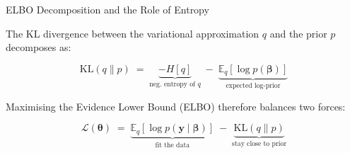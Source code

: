 \documentclass[aspectratio=169,12pt]{beamer}
\newcommand{\KL}{\mathrm{KL}}
\begin{document}
\begin{frame}{ELBO Decomposition and the Role of Entropy}

\bigskip

The KL divergence between the variational approximation $q$ and the prior $p$
decomposes as:

\bigskip
\begin{equation*}
  \KL(q \| p)
    \;=\;
    \underbrace{-H[q]}_{\displaystyle\text{neg.\ entropy of } q}
    \;-\;
    \underbrace{\mathbb{E}_{q}[\log p(\bm{\beta})]}_{\displaystyle\text{expected log-prior}}
\end{equation*}

\bigskip\bigskip

Maximising the Evidence Lower Bound (ELBO) therefore balances two forces:

\bigskip
\begin{equation*}
  \mathcal{L}(\bm{\theta})
    \;=\;
    \underbrace{\mathbb{E}_{q}[\log p(\mathbf{y} \mid \bm{\beta})]}_{\displaystyle\text{fit the data}}
    \;-\;
    \underbrace{\KL(q \| p)}_{\displaystyle\text{stay close to prior}}
\end{equation*}

\end{frame}
\end{document}
